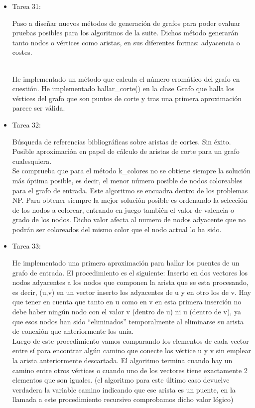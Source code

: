 \begin{itemize}
\item Tarea 31:

Paso a diseñar nuevos métodos de generación de grafos para poder evaluar pruebas posibles para los algoritmos de la suite. Dichos método generarán tanto nodos o vértices como aristas, en sus diferentes formas: adyacencia o costes.\\\

He implementado un método que calcula el número cromático del grafo en cuestión.
He implementado hallar\_corte() en la clase Grafo que halla los vértices del grafo que son puntos de corte y tras una primera aproximación parece ser válida.\\

\item Tarea 32:

Búsqueda de referencias bibliográficas sobre aristas de cortes. Sin éxito. Posible aproximación en papel de cálculo de aristas de corte para un grafo cualesquiera.\\

Se comprueba que para el método k\_colores no se obtiene siempre la solución más óptima posible, es decir, el menor número posible de nodos coloreables para el grafo de entrada. Este algoritmo se encuadra dentro de los problemas NP. Para obtener siempre la mejor solución posible es ordenando la selección de los nodos a colorear, entrando en juego también el valor de valencia o grado de los nodos. Dicho valor afecta al numero de nodos adyacente que no podrán ser coloreados del mismo color que el nodo actual lo ha sido.\\

\item Tarea 33:

He implementado una primera aproximación para hallar los puentes de un grafo de entrada. El procedimiento es el siguiente: Inserto en dos vectores los nodos adyacentes a los nodos que componen la arista que se esta procesando, es decir, (u,v) en un vector inserto los adyacentes de u y en otro los de v. Hay que tener en cuenta que tanto en u como en v en esta primera inserción no debe haber ningún nodo con el valor v (dentro de u) ni u (dentro de v), ya que esos nodos han sido ``eliminados'' temporalmente al eliminarse su arista de conexión que anteriormente los unía.\\

Luego de este procedimiento vamos comparando los elementos de cada vector entre sí para encontrar algún camino que conecte los vértice u y v sin emplear la arista anteriormente descartada. El algoritmo termina cuando hay un camino entre otros vértices o cuando uno de los vectores tiene exactamente 2 elementos que son iguales. (el algoritmo para este último caso devuelve verdadera la variable camino indicando que ese arista es un puente, en la llamada a este procedimiento recursivo comprobamos dicho valor lógico)\\


\end{itemize}
